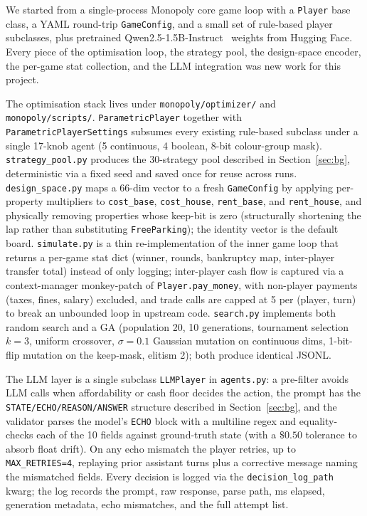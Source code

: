\documentclass[10pt]{article}
\begin{document}
We started from a single-process Monopoly core game loop with a
\texttt{Player} base class, a YAML round-trip \texttt{GameConfig}, and
a small set of rule-based player subclasses, plus pretrained
Qwen2.5-1.5B-Instruct~\cite{qwen25} weights from Hugging Face. Every
piece of the optimisation loop, the strategy pool, the design-space
encoder, the per-game stat collection, and the LLM integration was new
work for this project.

The optimisation stack lives under \texttt{monopoly/optimizer/} and
\texttt{monopoly/scripts/}. \texttt{ParametricPlayer} together with
\texttt{ParametricPlayerSettings} subsumes every existing rule-based
subclass under a single 17-knob agent (5 continuous, 4 boolean, 8-bit
colour-group mask). \texttt{strategy\_pool.py} produces the 30-strategy
pool described in Section~\ref{sec:bg}, deterministic via a fixed seed
and saved once for reuse across runs. \texttt{design\_space.py} maps a
66-dim vector to a fresh \texttt{GameConfig} by applying per-property
multipliers to \texttt{cost\_base}, \texttt{cost\_house},
\texttt{rent\_base}, and \texttt{rent\_house}, and physically removing
properties whose keep-bit is zero (structurally shortening the lap
rather than substituting \texttt{FreeParking}); the identity vector is
the default board. \texttt{simulate.py} is a thin re-implementation of
the inner game loop that returns a per-game stat dict (winner, rounds,
bankruptcy map, inter-player transfer total) instead of only logging;
inter-player cash flow is captured via a context-manager monkey-patch
of \texttt{Player.pay\_money}, with non-player payments (taxes, fines,
salary) excluded, and trade calls are capped at 5 per (player, turn)
to break an unbounded loop in upstream code. \texttt{search.py}
implements both random search and a GA (population 20, 10 generations,
tournament selection $k{=}3$, uniform crossover, $\sigma{=}0.1$
Gaussian mutation on continuous dims, 1-bit-flip mutation on the
keep-mask, elitism 2); both produce identical JSONL.

The LLM layer is a single subclass \texttt{LLMPlayer} in
\texttt{agents.py}: a pre-filter avoids LLM calls when affordability
or cash floor decides the action, the prompt has the
\texttt{STATE/ECHO/REASON/ANSWER} structure described in
Section~\ref{sec:bg}, and the validator parses the model's
\texttt{ECHO} block with a multiline regex and equality-checks each of
the 10 fields against ground-truth state (with a $\$0.50$ tolerance to
absorb float drift). On any echo mismatch the player retries, up to
\texttt{MAX\_RETRIES=4}, replaying prior assistant turns plus a
corrective message naming the mismatched fields. Every decision is
logged via the \texttt{decision\_log\_path} kwarg; the log records the
prompt, raw response, parse path, ms elapsed, generation metadata,
echo mismatches, and the full attempt list.
\end{document}
